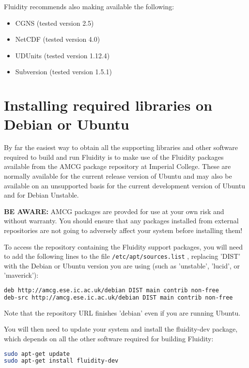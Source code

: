 Fluidity recommends also making available the following:

\begin{itemize}
\item CGNS (tested version 2.5)
\item NetCDF (tested version 4.0)
\item UDUnits (tested version 1.12.4)
\item Subversion (tested version 1.5.1)
\end{itemize}

\section{Installing required libraries on Debian or Ubuntu}
\label{sect:required_ḻibraries_debian}

By far the easiest way to obtain all the supporting libraries and other
software required to build and run Fluidity is to make use of the Fluidity
packages available from the AMCG package repository at Imperial College.  These
are normally available for the current release version of Ubuntu and may also
be available on an unsupported basis for the current development version of
Ubuntu and for Debian Unstable.

\textbf{BE AWARE:} AMCG packages are provded for use at your own risk and
without warranty. You should ensure that any packages installed from external
repositories are not going to adversely affect your system before installing
them!

To access the repository containing the Fluidity support packages, you will
need to add the following lines to the file
\lstinline[language=bash]+/etc/apt/sources.list+ , replacing 'DIST' with
the Debian or Ubuntu version you are using (such as 'unstable', 'lucid', or
'maverick'):

\begin{lstlisting}[language=bash]
deb http://amcg.ese.ic.ac.uk/debian DIST main contrib non-free
deb-src http://amcg.ese.ic.ac.uk/debian DIST main contrib non-free
\end{lstlisting}

Note that the repository URL finishes 'debian' even if you are running Ubuntu.

You will then need to update your system and install the fluidity-dev package,
which depends on all the other software required for building Fluidity:

\begin{lstlisting}[language=bash]
sudo apt-get update
sudo apt-get install fluidity-dev
\end{lstlisting}

